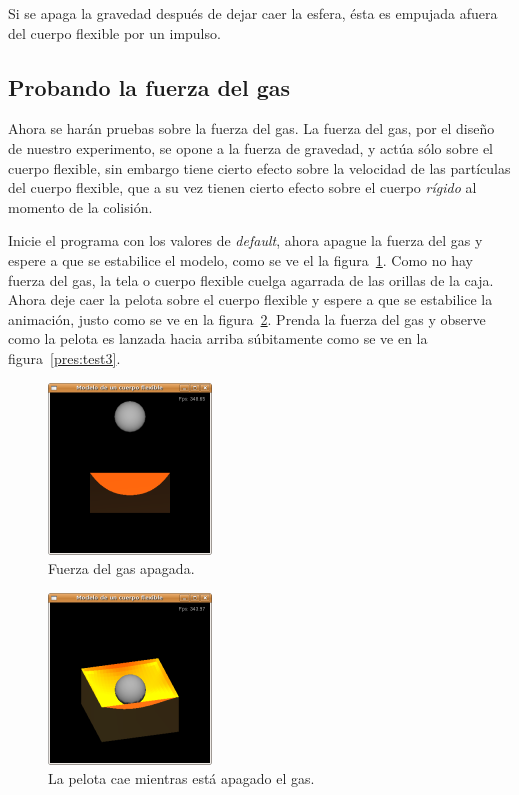 Si se apaga la gravedad después de dejar caer la esfera, ésta es empujada afuera del cuerpo flexible por un impulso.

\subsection{Probando la fuerza del gas}
Ahora se harán pruebas sobre la fuerza del gas. La fuerza del gas, por el diseño de nuestro experimento, se opone a la fuerza de gravedad, y actúa sólo sobre el cuerpo flexible, sin embargo tiene cierto efecto sobre la velocidad de las partículas del cuerpo flexible, que a su vez tienen cierto efecto sobre el cuerpo \emph{rígido} al momento de la colisión.

Inicie el programa con los valores de \emph{\foreignlanguage{english}{default}}, ahora apague la fuerza del gas y espere a que se estabilice el modelo, como se ve el la figura~\ref{pres:test1}.
Como no hay fuerza del gas, la tela o cuerpo flexible cuelga agarrada de las orillas de la caja.
Ahora deje caer la pelota sobre el cuerpo flexible y espere a que se estabilice la animación, justo como se ve en la figura~\ref{pres:test2}. 
Prenda la fuerza del gas y observe como la pelota es lanzada hacia arriba súbitamente como se ve en la figura~\ref{pres:test3}.

\begin{figure}
 \centering
 \includegraphics[]{Img/modPres1}
 \caption[Ejecución con la fuerza del gas apagada]{Fuerza del gas apagada.}
 \label{pres:test1}
\end{figure}

\begin{figure}
 \centering
 \includegraphics[]{Img/modPres2}
 \caption[Ejecución con la esfera cayendo en ausencia de fuerza del gas]{La pelota cae mientras está apagado el gas.}
 \label{pres:test2}
\end{figure}


